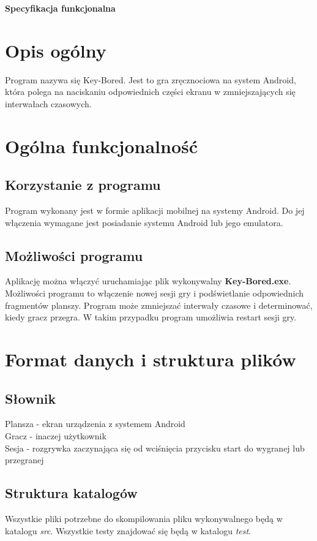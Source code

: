 \documentclass[11pt]{article}
\begin{document}
\begin{huge}
\begin{center}
\textbf{Specyfikacja funkcjonalna}
\end{center}
\end{huge}

\tableofcontents

\section{Opis ogólny}
Program nazywa się Key-Bored. Jest to gra zręcznociowa na system Android, która polega na naciskaniu odpowiednich części ekranu w zmniejszających się interwałach czasowych.

\section{Ogólna funkcjonalność}
\subsection{Korzystanie z programu}
Program wykonany jest w formie aplikacji mobilnej na systemy Android. Do jej włączenia wymagane jest posiadanie systemu Android lub jego emulatora.
\subsection{Możliwości programu}
Aplikację można włączyć uruchamiając plik wykonywalny \textbf{Key-Bored.exe}. Możliwości programu to włączenie nowej sesji gry i podświetlanie odpowiednich fragmentów planszy. Program może zmniejszać interwały czasowe i determinować, kiedy gracz przegra. W takim przypadku program umożliwia restart sesji gry.

\section{Format danych i struktura plików}
\subsection{Słownik}
Plansza - ekran urządzenia z systemem Android\\
Gracz - inaczej użytkownik\\
Sesja - rozgrywka zaczynająca się od wciśnięcia przycisku start do wygranej lub przegranej
\subsection{Struktura katalogów}
Wszystkie pliki potrzebne do skompilowania pliku wykonywalnego będą w katalogu \textit{src}. Wszystkie testy znajdować się będą w katalogu \textit{test}.
\end{document}
